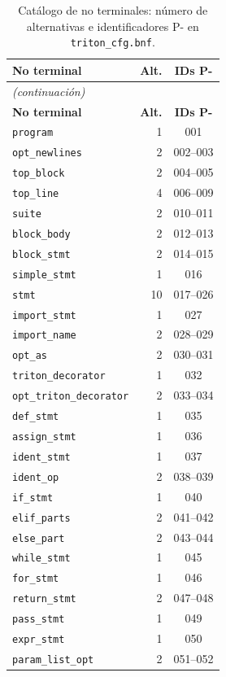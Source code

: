 \begin{longtable}{@{}p{4.0cm}rc@{}}
\caption{Catálogo de no terminales: número de alternativas e identificadores P- en \texttt{triton\_cfg.bnf}.}
\label{tab:inventario-nt} \\
\toprule
\textbf{No terminal} & \textbf{Alt.} & \textbf{IDs P-} \\
\midrule
\endfirsthead
\multicolumn{3}{l}{\textit{(continuación)}} \\
\toprule
\textbf{No terminal} & \textbf{Alt.} & \textbf{IDs P-} \\
\midrule
\endhead
\texttt{program} & 1 & 001 \\
\texttt{opt\_newlines} & 2 & 002--003 \\
\texttt{top\_block} & 2 & 004--005 \\
\texttt{top\_line} & 4 & 006--009 \\
\texttt{suite} & 2 & 010--011 \\
\texttt{block\_body} & 2 & 012--013 \\
\texttt{block\_stmt} & 2 & 014--015 \\
\texttt{simple\_stmt} & 1 & 016 \\
\texttt{stmt} & 10 & 017--026 \\
\texttt{import\_stmt} & 1 & 027 \\
\texttt{import\_name} & 2 & 028--029 \\
\texttt{opt\_as} & 2 & 030--031 \\
\texttt{triton\_decorator} & 1 & 032 \\
\texttt{opt\_triton\_decorator} & 2 & 033--034 \\
\texttt{def\_stmt} & 1 & 035 \\
\texttt{assign\_stmt} & 1 & 036 \\
\texttt{ident\_stmt} & 1 & 037 \\
\texttt{ident\_op} & 2 & 038--039 \\
\texttt{if\_stmt} & 1 & 040 \\
\texttt{elif\_parts} & 2 & 041--042 \\
\texttt{else\_part} & 2 & 043--044 \\
\texttt{while\_stmt} & 1 & 045 \\
\texttt{for\_stmt} & 1 & 046 \\
\texttt{return\_stmt} & 2 & 047--048 \\
\texttt{pass\_stmt} & 1 & 049 \\
\texttt{expr\_stmt} & 1 & 050 \\
\texttt{param\_list\_opt} & 2 & 051--052 \\

\end{longtable}
